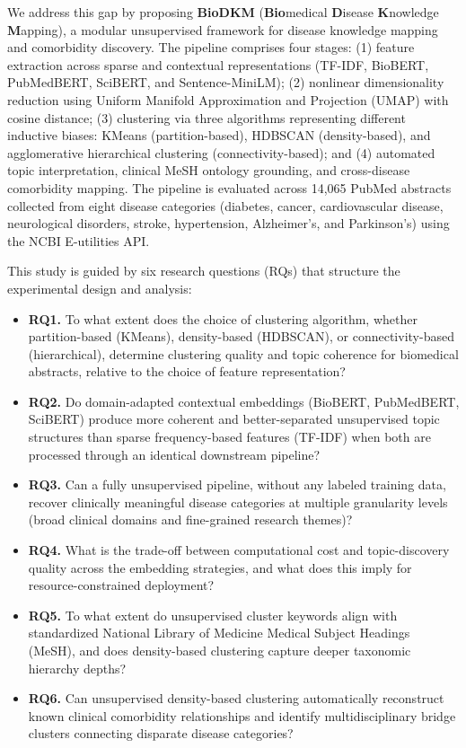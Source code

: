 \documentclass[a4paper,10pt,conference]{IEEEtran}
\begin{document}
We address this gap by proposing \textbf{BioDKM} (\textbf{Bio}medical \textbf{D}isease \textbf{K}nowledge \textbf{M}apping), a modular unsupervised framework for disease knowledge mapping and comorbidity discovery. The pipeline comprises four stages: (1) feature extraction across sparse and contextual representations (TF-IDF, BioBERT, PubMedBERT, SciBERT, and Sentence-MiniLM); (2) nonlinear dimensionality reduction using Uniform Manifold Approximation and Projection (UMAP) with cosine distance; (3) clustering via three algorithms representing different inductive biases: KMeans (partition-based), HDBSCAN (density-based), and agglomerative hierarchical clustering (connectivity-based); and (4) automated topic interpretation, clinical MeSH ontology grounding, and cross-disease comorbidity mapping. The pipeline is evaluated across 14,065 PubMed abstracts collected from eight disease categories (diabetes, cancer, cardiovascular disease, neurological disorders, stroke, hypertension, Alzheimer's, and Parkinson's) using the NCBI E-utilities API.

This study is guided by six research questions (RQs) that structure the experimental design and analysis:
\begin{itemize}
\item \textbf{RQ1.} To what extent does the choice of clustering algorithm, whether partition-based (KMeans), density-based (HDBSCAN), or connectivity-based (hierarchical), determine clustering quality and topic coherence for biomedical abstracts, relative to the choice of feature representation?
\item \textbf{RQ2.} Do domain-adapted contextual embeddings (BioBERT, PubMedBERT, SciBERT) produce more coherent and better-separated unsupervised topic structures than sparse frequency-based features (TF-IDF) when both are processed through an identical downstream pipeline?
\item \textbf{RQ3.} Can a fully unsupervised pipeline, without any labeled training data, recover clinically meaningful disease categories at multiple granularity levels (broad clinical domains and fine-grained research themes)?
\item \textbf{RQ4.} What is the trade-off between computational cost and topic-discovery quality across the embedding strategies, and what does this imply for resource-constrained deployment?
\item \textbf{RQ5.} To what extent do unsupervised cluster keywords align with standardized National Library of Medicine Medical Subject Headings (MeSH), and does density-based clustering capture deeper taxonomic hierarchy depths?
\item \textbf{RQ6.} Can unsupervised density-based clustering automatically reconstruct known clinical comorbidity relationships and identify multidisciplinary bridge clusters connecting disparate disease categories?
\end{itemize}
\end{document}
